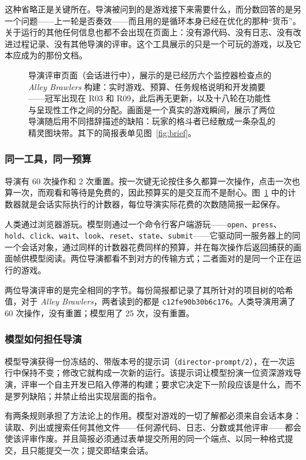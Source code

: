 这种省略正是关键所在。导演被问到的是游戏接下来需要什么，而分数回答的是另一个问题——上一轮是否奏效——而且用的是循环本身已经在优化的那种“货币”。关于运行的其他任何信息也都不会出现在页面上：没有源代码、没有日志、没有改进过程记录、没有其他导演的评审。这个工具展示的只是一个可玩的游戏，以及它本应成为的那份文档。

\begin{figure}[t]
\centering
{}
\caption{导演评审页面（会话进行中），展示的是已经历六个监控器检查点的 \textit{Alley Brawlers} 构建：实时游戏、预算、任务规格说明和开发摘要——冠军出现在 R03 和 R09，此后再无更新，以及十八轮在功能性与呈现性工作之间的分配。画面是一个真实的游戏瞬间，展示了两位导演随后用不同措辞描述的缺陷：玩家的格斗者已经散成一条杂乱的精灵图块带。其下的简报表单见图~\ref{fig:brief}。}
\label{fig:director}
\end{figure}

\subsubsection{同一工具，同一预算}
导演有 60 次操作和 2 次重置。按一次键无论按住多久都算一次操作，点击一次也算一次，而观看和等待是免费的，因此预算买的是交互而不是耐心。图~\ref{fig:director} 中的计数器就是会话实际执行的计数器，每位导演实际花费的次数随简报一起保存。

人类通过浏览器游玩。模型则通过一个命令行客户端游玩——\texttt{open}、\texttt{press}、\texttt{hold}、\texttt{click}、\texttt{wait}、\texttt{look}、\texttt{reset}、\texttt{state}、\texttt{submit}——它驱动同一服务器上的同一个会话对象，通过同样的计数器花费同样的预算，并在每次操作后返回捕获的画面帧供模型阅读。两位导演都看不到对方的传输方式；二者面对的是同一个正在运行的游戏。

两位导演评审的是完全相同的字节。每份简报都记录了其所针对的项目树的哈希值，对于 \textit{Alley Brawlers}，两者读到的都是 \texttt{c12fe90b30b6c176}。人类导演用满了 60 次操作，没有重置；模型用了 25 次，没有重置。

\subsubsection{模型如何担任导演}
模型导演获得一份冻结的、带版本号的提示词（\texttt{director-prompt/2}），在一次运行中保持不变；修改它就构成一次新的运行。该提示词让模型扮演一位资深游戏导演，评审一个自主开发已陷入停滞的构建；要求它决定下一阶段应该是什么，而不是罗列缺陷；并禁止给出实现层面的指令。

有两条规则承担了方法论上的作用。模型对游戏的一切了解都必须来自会话本身：读取、列出或搜索任何其他文件——任何源代码、日志、分数或其他评审——都会使该评审作废。并且简报必须通过表单提交所用的同一个端点、以同一种格式提交，且只能提交一次；提交即结束会话。

